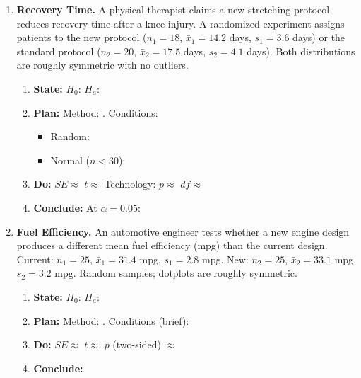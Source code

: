 \documentclass[10pt]{article}
\begin{document}
\begin{enumerate}
\vspace{0.05in}

\item \textbf{Recovery Time.} \quad
A physical therapist claims a new stretching protocol reduces recovery time after a knee
injury. A randomized experiment assigns patients to the new protocol ($n_1 = 18$,
$\bar x_1 = 14.2$ days, $s_1 = 3.6$ days) or the standard protocol ($n_2 = 20$,
$\bar x_2 = 17.5$ days, $s_2 = 4.1$ days). Both distributions are roughly symmetric with
no outliers.

\begin{enumerate}[label=\alph*.]
  \item \textbf{State:} $H_0$: \blank{4cm} \quad $H_a$: \blank{4cm}
  \item \textbf{Plan:} Method: \blank{5cm}. Conditions:
        \begin{itemize}
          \item Random: \writeline
          \item Normal ($n < 30$): \writeline
        \end{itemize}
  \item \textbf{Do:} $SE \approx$ \blank{2.5cm} \quad $t \approx$ \blank{2cm}
        \quad Technology: $p \approx$ \blank{2cm} \quad $df \approx$ \blank{2cm}
  \item \textbf{Conclude:} At $\alpha = 0.05$: 
\end{enumerate}

\vspace{0.05in}

\item \textbf{Fuel Efficiency.} \quad
An automotive engineer tests whether a new engine design produces a different mean fuel
efficiency (mpg) than the current design. Current: $n_1 = 25$, $\bar x_1 = 31.4$ mpg,
$s_1 = 2.8$ mpg. New: $n_2 = 25$, $\bar x_2 = 33.1$ mpg, $s_2 = 3.2$ mpg. Random samples;
dotplots are roughly symmetric.

\begin{enumerate}[label=\alph*.]
  \item \textbf{State:} $H_0$: \blank{4cm} \quad $H_a$: \blank{4cm}
  \item \textbf{Plan:} Method: \blank{5cm}. Conditions (brief): \writeline
  \item \textbf{Do:} $SE \approx$ \blank{2.5cm} \quad $t \approx$ \blank{2cm}
        \quad $p$ (two-sided) $\approx$ \blank{2cm}
  \item \textbf{Conclude:} 
\end{enumerate}

\end{enumerate}
\end{document}
